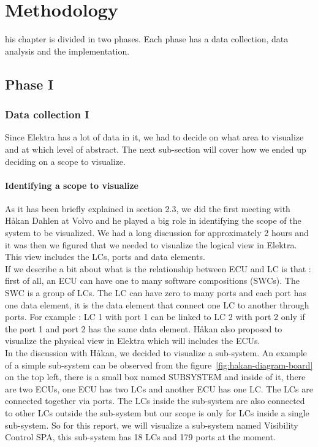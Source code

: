 \chapter{Methodology}
\label{methodology}
\lettrine[findent=2pt]{}{ }his chapter is divided in two phases. Each phase has a data collection, data analysis and the implementation. 

\section{Phase I}

\subsection{Data collection I}
Since Elektra has a lot of data in it, we had to decide on what area to visualize and at which level of abstract. The next sub-section will cover how we ended up deciding on a scope to visualize.

\subsubsection{Identifying a scope to visualize}
As it has been briefly explained in section 2.3, we did the first meeting with Håkan Dahlen at Volvo and he played a big role in identifying the scope of the system to be visualized. We had a long discussion for approximately 2 hours and it was then we figured that we needed to visualize the logical view in Elektra. This view includes the LCs, ports and data elements. \\

If we describe a bit about what is the relationship between ECU and LC is that : first of all, an ECU can have one to many software compositions (SWCs). The SWC is a group of LCs. The LC can have zero to many ports and each port has one data element, it is the data element that connect one LC to another through ports. For example : LC 1 with port 1 can be linked to LC 2 with port 2 only if the port 1 and port 2 has the same data element. Håkan also proposed to visualize the physical view in Elektra which will includes the ECUs.\\

In the discussion with Håkan, we decided to visualize a sub-system. An example of a simple sub-system can be observed from the figure~\ref{fig:hakan-diagram-board} on the top left, there is a small box named SUBSYSTEM and inside of it, there are two ECUs, one ECU has two LCs and another ECU has one LC. The LCs are connected together via ports. The LCs inside the sub-system are also connected to other LCs outside the sub-system but our scope is only for LCs inside a single sub-system. So for this report, we will visualize a sub-system named Visibility Control SPA, this sub-system has 18 LCs and 179 ports at the moment.\\


